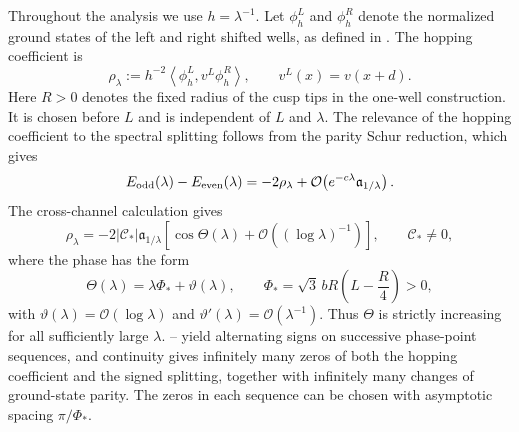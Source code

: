 \documentclass[11pt]{article}
\newcommand{\cO}{\mathcal O}
\newcommand{\ip}[2]{\left\langle #1,#2\right\rangle}
\begin{document}
Throughout the analysis we use $h=\lambda^{-1}$. Let $\phi_h^L$ and
$\phi_h^R$ denote the normalized ground states of the left and right shifted
wells, as defined in . The hopping
coefficient is
\begin{equation}\label{eq:rho-intro}
 \rho_\lambda:=h^{-2}\ip{\phi_h^L}{v^L\phi_h^R},
 \qquad v^L(x)=v(x+d).
\end{equation}
Here $R>0$ denotes the fixed radius of the cusp tips in the one-well
construction. It is chosen before $L$ and is independent of $L$ and
$\lambda$. The relevance of the hopping coefficient to the spectral
splitting follows from the parity Schur reduction, which gives
\begin{equation}\label{eq:introestimgap}
 E_{\rm odd}(\lambda)-E_{\rm even}(\lambda)
 =-2\rho_\lambda
 +\cO\!\left(e^{-c\lambda}\mathfrak a_{1/\lambda}\right).
\end{equation}
The cross-channel calculation gives
\begin{equation}\label{eq:introestimrhol}
 \rho_\lambda
 =-2|\mathscr C_*|\mathfrak a_{1/\lambda}
 \left[
  \cos\Theta(\lambda)
  +\cO\!\left((\log\lambda)^{-1}\right)
 \right],
 \qquad \mathscr C_*\ne0,
\end{equation}
where the phase has the form
\begin{equation}\label{eq:intro-phase}
 \Theta(\lambda)=\lambda\Phi_*+\vartheta(\lambda),
 \qquad
 \Phi_*=\sqrt3\,bR\left(L-\frac R4\right)>0,
\end{equation}
with $\vartheta(\lambda)=\cO(\log\lambda)$ and
$\vartheta'(\lambda)=\cO(\lambda^{-1})$. Thus $\Theta$ is strictly
increasing for all sufficiently large $\lambda$. 
-- yield alternating signs
on successive phase-point sequences, and continuity gives infinitely many
zeros of both the hopping coefficient and the signed splitting, together
with infinitely many changes of ground-state parity. The zeros in each sequence
can be chosen with asymptotic spacing $\pi/\Phi_*$.
\end{document}
